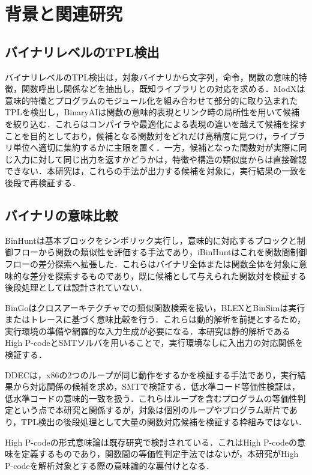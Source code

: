 \section{背景と関連研究}

\subsection{バイナリレベルのTPL検出}
バイナリレベルのTPL検出は，対象バイナリから文字列，命令，関数の意味的特徴，関数呼出し関係などを抽出し，既知ライブラリとの対応を求める．ModX\cite{modx}は意味的特徴とプログラムのモジュール化を組み合わせて部分的に取り込まれたTPLを検出し，BinaryAI\cite{binaryai}は関数の意味的表現とリンク時の局所性を用いて候補を絞り込む．これらはコンパイラや最適化による表現の違いを越えて候補を探すことを目的としており，候補となる関数対をどれだけ高精度に見つけ，ライブラリ単位へ適切に集約するかに主眼を置く．一方，候補となった関数対が実際に同じ入力に対して同じ出力を返すかどうかは，特徴や構造の類似度からは直接確認できない．本研究は，これらの手法が出力する候補を対象に，実行結果の一致を後段で再検証する．

\subsection{バイナリの意味比較}
BinHunt\cite{binhunt}は基本ブロックをシンボリック実行し，意味的に対応するブロックと制御フローから関数の類似性を評価する手法であり，iBinHunt\cite{ibinhunt}はこれを関数間制御フローの差分探索へ拡張した．これらはバイナリ全体または関数全体を対象に意味的な差分を探索するものであり，既に候補として与えられた関数対を検証する後段処理としては設計されていない．

BinGo\cite{bingo}はクロスアーキテクチャでの類似関数検索を扱い，BLEX\cite{blex}とBinSim\cite{binsim}は実行またはトレースに基づく意味比較を行う．これらは動的解析を前提とするため，実行環境の準備や網羅的な入力生成が必要になる．本研究は静的解析であるHigh P-codeとSMTソルバを用いることで，実行環境なしに入出力の対応関係を検証する．

DDEC\cite{ddec}は，x86の2つのループが同じ動作をするかを検証する手法であり，実行結果から対応関係の候補を求め，SMTで検証する．低水準コード等価性検証\cite{lowlevel-eq}は，低水準コードの意味的一致を扱う．これらはループを含むプログラムの等価性判定という点で本研究と関係するが，対象は個別のループやプログラム断片であり，TPL検出の後段処理として大量の関数対応候補を検証する枠組みではない．

High P-codeの形式意味論は既存研究で検討されている\cite{formal-pcode}．これはHigh P-codeの意味を定義するものであり，関数間の等価性判定手法ではないが，本研究がHigh P-codeを解析対象とする際の意味論的な裏付けとなる．

